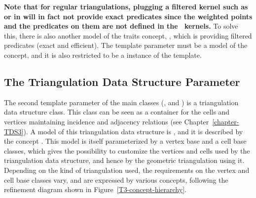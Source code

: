 \textbf{Note that for regular triangulations, plugging a filtered kernel such
as  or
 in
 will in fact
not provide exact predicates since the weighted points and the
predicates on them are not defined in the \cgal\ kernels.} 
To solve this, there is also another model of the traits concept,
, which is providing filtered
predicates (exact and efficient). The template parameter  must be a
model of the  concept, and it is also restricted to be a
instance of the  template. 

\subsection{The Triangulation Data Structure Parameter}
\label{Triangulation3-sec-tds}

The second template parameter of the main classes (,
 and ) is a
triangulation data structure class.  This class can be seen as a container for
the cells and vertices maintaining incidence and adjacency relations (see
Chapter~\ref{chapter-TDS3}).  A model of this triangulation data structure is
,
and it is described by the  concept
.  This model is itself
parameterized by a vertex base and a cell base classes, which gives the
possibility to customize the vertices and cells used by the triangulation data
structure, and hence by the geometric triangulation using it.  Depending on the
kind of triangulation used, the requirements on the vertex and cell base
classes vary, and are expressed by various concepts, following the refinement
diagram shown in Figure~\ref{T3-concept-hierarchy}.

